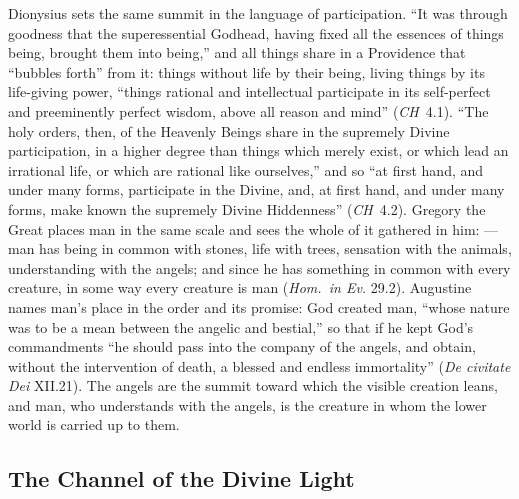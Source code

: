 Dionysius sets the same summit in the language of participation. ``It was
through goodness that the superessential Godhead, having fixed all the
essences of things being, brought them into being,'' and all things share in
a Providence that ``bubbles forth'' from it: things without life by their
being, living things by its life-giving power, ``things rational and
intellectual participate in its self-perfect and preeminently perfect wisdom,
above all reason and mind'' (\emph{CH}~4.1). ``The holy orders, then, of the
Heavenly Beings share in the supremely Divine participation, in a higher
degree than things which merely exist, or which lead an irrational life, or
which are rational like ourselves,'' and so ``at first hand, and under many
forms, participate in the Divine, and, at first hand, and under many forms,
make known the supremely Divine Hiddenness'' (\emph{CH}~4.2). Gregory the
Great places man in the same scale and sees the whole of it gathered in him:
 ---
man has being in common with stones, life with trees, sensation with the
animals, understanding with the angels; and since he has something in
common with every creature, in some way every creature is man (\emph{Hom.\ in
Ev.} 29.2). Augustine names man's place in the order and its promise:
God created man, ``whose nature was to be a mean between the angelic and
bestial,'' so that if he kept God's commandments ``he should pass into the
company of the angels, and obtain, without the intervention of death, a
blessed and endless immortality'' (\emph{De civitate Dei} XII.21). The
angels are the summit toward which the visible creation leans, and man, who
understands with the angels, is the creature in whom the lower world is
carried up to them.

\subsection{The Channel of the Divine Light}

